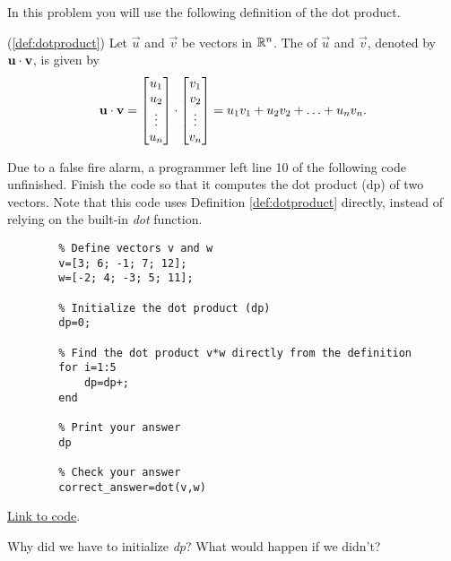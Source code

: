 \documentclass{ximera}
\begin{document}
\begin{problem}\label{prob_oct_vec_loop}
    In this problem you will use the following definition of the dot product.

    \begin{definition}(\ref{def:dotproduct})
        Let $\vec{u}$ and $\vec{v}$ be vectors in $\mathbb{R}^n$.  The  of $\vec{u}$ and $\vec{v}$, denoted by
        $\mathbf{u}\cdot \mathbf{v}$, is given by
        \begin{align*}
          \mathbf{u}\cdot\mathbf{v}=\begin{bmatrix}u_1\\u_2\\\vdots\\u_n\end{bmatrix}\cdot\begin{bmatrix}v_1\\v_2\\\vdots\\v_n\end{bmatrix}=u_1v_1+u_2v_2+\ldots+u_nv_n.
        \end{align*}
      \end{definition}
\begin{question}
    Due to a false fire alarm, a programmer left line 10 of the following code unfinished.  Finish the code so that it computes the dot product (dp) of two vectors.  Note that this code uses Definition \ref{def:dotproduct} directly, instead of relying on the built-in \emph{dot} function.

    \begin{verbatim}
        % Define vectors v and w
        v=[3; 6; -1; 7; 12];
        w=[-2; 4; -3; 5; 11];

        % Initialize the dot product (dp)
        dp=0;

        % Find the dot product v*w directly from the definition
        for i=1:5
            dp=dp+;
        end

        % Print your answer
        dp

        % Check your answer
        correct_answer=dot(v,w)
    \end{verbatim}

    \href{https://sagecell.sagemath.org/?z=eJxdjssKwjAQRfeB_MPdFHwVjPUBSlaK4M59EZEmxWBNyhgT9OtNqRud3cy9nDkZdro2ViPoyjt6IOBiFSJnQZYFlsgFVhCz04azKMt8hjnyAgsI0Z04y3CwxptLY94a_qqhnEdLTj0rj4Fqh5ypVk6_3b1J8P9WGEUoQ0mgeaEmd-8bnVciO8tZ7QhGivWCM6RJQNWOE1Jb1XOPZKzHyz0p6T-ipu5rH22vurr9RpWj7tu532VyGYRJHH4ATLJPyQ==&lang=octave&interacts=eJyLjgUAARUAuQ==}{Link to code}.

    Why did we have to initialize \emph{dp}?  What would happen if we didn't?
\end{question}
\end{problem}
 
\end{document}

